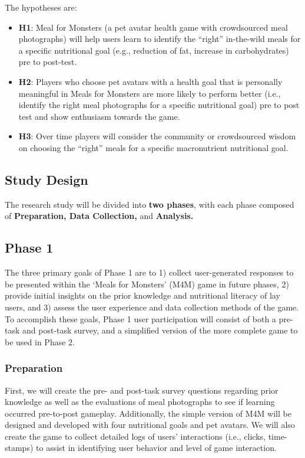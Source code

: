 The hypotheses are:
\begin{itemize}
    \item \textbf{H1}: Meal for Monsters (a pet avatar health game with crowdsourced meal photographs) will help users learn to identify the ``right'' in-the-wild meals for a specific nutritional goal (e.g., reduction of fat, increase in carbohydrates) pre to post-test.
    \item \textbf{H2}: Players who choose pet avatars with a health goal that is personally meaningful in Meals for Monsters are more likely to perform better (i.e., identify the right meal photographs for a specific nutritional goal) pre to post test and show enthusiasm towards the game. 
    \item \textbf{H3}: Over time players will consider the community or crowdsourced wisdom on choosing the ``right'' meals for a specific macronutrient nutritional goal.

\end{itemize}

\subsection{Study Design}
The research study will be divided into \textbf{two phases}, with each phase composed of \textbf{Preparation, Data Collection,} and \textbf{Analysis.}  

\subsection{Phase 1}
The three primary goals of Phase 1 are to 1) collect user-generated responses to be presented within the `Meals for Monsters' (M4M) game in future phases, 2) provide initial insights on the prior knowledge and nutritional literacy of lay users, and 3) assess the user experience and data collection methods of the game. 
To accomplish these goals, Phase 1 user participation will consist of both a pre-task and post-task survey, and a simplified version of the more complete game to be used in Phase 2.

\subsubsection{Preparation}
First, we will create the pre- and post-task survey questions regarding prior knowledge as well as the evaluations of meal photographs to see if learning occurred pre-to-post gameplay. Additionally, the simple version of M4M will be designed and developed with four nutritional goals and pet avatars.
We will also create the game to collect detailed logs of users' interactions (i.e., clicks, time-stamps) to assist in identifying user behavior and level of game interaction.

